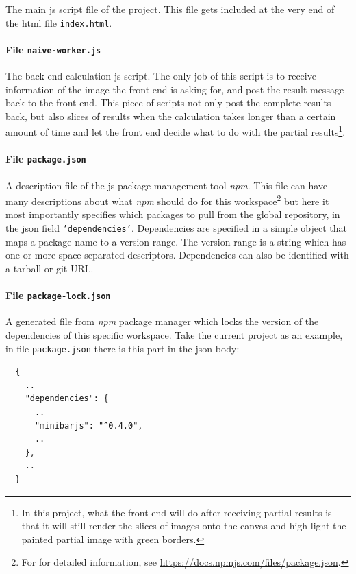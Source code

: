 The main \gls{js} script file of the project. This file gets included at the very end of the \gls{html} file \texttt{index.html}.

\paragraph{File \texttt{naive-worker.js}}

The back end calculation \gls{js} script. The only job of this script is to receive information of the image the front end is asking for, and post the result message back to the front end. This piece of scripts not only post the complete results back, but also slices of results when the calculation takes longer than a certain amount of time and let the front end decide what to do with the partial results\footnote{ In this project, what the front end will do after receiving partial results is that it will still render the slices of images onto the canvas and high light the painted partial image with green borders. }.

\paragraph{File \texttt{package.json}}

A description file of the \gls{js} package management tool \emph{npm}. This file can have many descriptions about what \emph{npm} should do for this workspace\footnote{ For for detailed information, see \url{https://docs.npmjs.com/files/package.json}.} but here it most importantly specifies which packages to pull from the global repository, in the \gls{json} field \texttt{'dependencies'}. Dependencies are specified in a simple object that maps a package name to a version range. The version range is a string which has one or more space-separated descriptors. Dependencies can also be identified with a tarball or git URL\cite{bib:npm:packagejson}.

\paragraph{File \texttt{package-lock.json}}

A generated file from \emph{npm} package manager which locks the version of the dependencies of this specific workspace. Take the current project as an example, in file \texttt{package.json} there is this part in the \gls{json} body:

\begin{verbatim}
  {
    ..
    "dependencies": {
      ..
      "minibarjs": "^0.4.0",
      ..
    },
    ..
  }
\end{verbatim}

